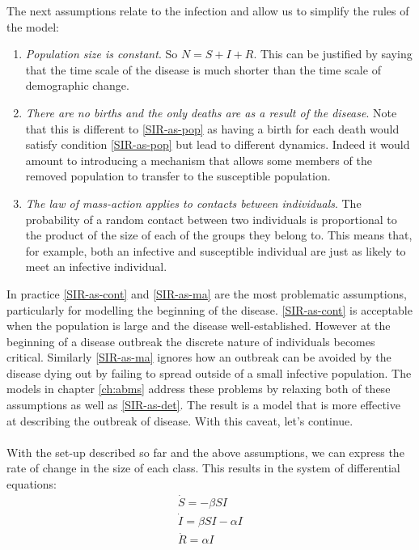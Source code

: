 The next assumptions relate to the infection and allow us to simplify the rules of the model:
\begin{enumerate}[resume, noitemsep, label=(\roman*)]
\item\label{SIR-as-pop} \textit{Population size is constant}. So $N=S+I+R$. This can be justified by saying that the time scale of the disease is much shorter than the time scale of demographic change.
\item\label{SIR-as-birth} \textit{There are no births and the only deaths are as a result of the disease}. Note that this is different to \ref{SIR-as-pop} as having a birth for each death would satisfy condition \ref{SIR-as-pop} but lead to different dynamics. Indeed it would amount to introducing a mechanism that allows some members of the removed population to transfer to the susceptible population.\label{mmd}
\item\label{SIR-as-ma} \textit{The law of mass-action applies to contacts between individuals\cite{mass-action}}. The probability of a random contact between two individuals is proportional to the product of the size of each of the groups they belong to. This means that, for example, both an infective and susceptible individual are just as likely to meet an infective individual.
\end{enumerate}
In practice \ref{SIR-as-cont} and \ref{SIR-as-ma} are the most problematic assumptions, particularly for modelling the beginning of the disease. \ref{SIR-as-cont} is acceptable when the population is large and the disease well-established. However at the beginning of a disease outbreak the discrete nature of individuals becomes critical. Similarly \ref{SIR-as-ma} ignores how an outbreak can be avoided by the disease dying out by failing to spread outside of a small infective population. The models in chapter \ref{ch:abms} address these problems by relaxing both of these assumptions as well as \ref{SIR-as-det}. The result is a model that is more effective at describing the outbreak of disease. With this caveat, let's continue.\\
\\
With the set-up described so far and the above assumptions, we can express the rate of change in the size of each class. This results in the system of differential equations:
\begin{eqnarray}
	\dot S=- \beta S I\label{SIR1}\\
	\dot I=\beta S I-\alpha I\label{SIR2}\\
	\dot R=\alpha I\label{SIR3}
\end{eqnarray}
